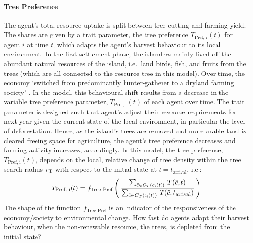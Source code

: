 \paragraph{Tree Preference}
The agent's total resource uptake is split between tree cutting and farming yield.
The shares are given by a trait parameter, the tree preference $T_\text{Pref, i}(t)$ for agent $i$ at time $t$, which adapts the agent's harvest behaviour to its local environment.
In the first settlement phase, the islanders mainly lived off the abundant natural resources of the island, i.e.\ land birds, fish, and fruits from the trees \citet{Bahn2017} (which are all connected to the resource tree in this model). 
Over time, the economy `switched from predominantly hunter-gatherer to a dryland farming society' \citep{Louwagie2006}.
In the model, this behavioural shift results from a decrease in the variable tree preference parameter, $T_\text{Pref, i}(t)$ of each agent over time.
The trait parameter is designed such that agent's adjust their resource requirements for next year given the current state of the local environment, in particular the level of deforestation. 
Hence, as the island's trees are removed and more arable land is cleared freeing space for agriculture, the agent's tree preference decreases and farming activity increases, accordingly.
In this model, the tree preference, $T_\text{Pref, i}(t)$, depends on the local, relative change of tree density within the tree search radius $r_{\rm T}$ with respect to the initial state at $t=t_\text{arrival}$, i.e.:
\begin{equation}\label{eq:TPref}
T_\text{Pref, i}(t) = f_\text{Tree Pref}\left( \, \frac{\sum_{\tilde{c} \in C_{T}(c_{\rm i}(t)) } \, T(\tilde{c}, t)}{\sum_{\tilde{c} \in C_{T}(c_{\rm i}(t))} \, T(\tilde{c}, t_\text{arrival}) } \, \right)
\end{equation}
The shape of the function $f_\text{Tree Pref}$ is an indicator of the responsiveness of the economy/society to environmental change. How fast do agents adapt their harvest behaviour, when the non-renewable resource, the trees, is depleted from the initial state?  
